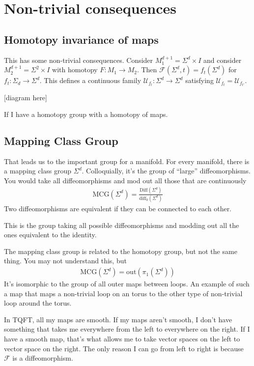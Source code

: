 \section{Non-trivial consequences}
\subsection{Homotopy invariance of maps}
This has some non-trivial consequences.
Consider $M_1^{d+1}=\Sigma^d\times I$
and consider $M_2^{d+1}=\Sigma^2\times I$
with homotopy
$F: M_1\to M_2$.
Then
$\mathcal{F}(\Sigma^d, t)
= f_t(\Sigma^d)$
for $f_t: \Sigma_d\to \Sigma^d$.
This defines a continuous family
$\mathcal{U}_{f_t}: \Sigma^d\to \Sigma^d$ satisfying
$\mathcal{U}_{f_t} = \mathcal{U}_{f_{t'}}$.

[diagram here]

If I have a homotopy group with a homotopy of maps.

\subsection{Mapping Class Group}
That leads us to the important group for a manifold.
For every manifold, there is a mapping class group $\Sigma^d$.
Colloquially, it's the group of ``large'' diffeomorphisms.
You would take all diffeomorphisms and mod out all those that are continuously
\begin{align}
    \mathrm{MCG}(\Sigma^d) = \frac{\mathrm{Diff}(\Sigma^d)}{\mathrm{diff}_0(\Sigma^d)}
\end{align}
Two diffeomorphisms are equivalent if they can be connected to each other.

This is the group taking all possible diffeomorphisms
and modding out all the ones equivalent to the identity.

The mapping class group is related to the homotopy group,
but not the same thing.
You may not understand this,
but
\begin{align}
    \mathrm{MCG}(\Sigma^d)
    = \mathrm{out}(\pi_1(\Sigma^d))
\end{align}
It's isomorphic to the group of all outer maps between loops.
An example of such a map that maps a non-trivial loop on an torus
to the other type of non-trivial loop around the torus.

In TQFT,
all my maps are smooth.
If my maps aren't smooth,
I don't have something that takes me everywhere from the left to everywhere on
the right.
If I have a smooth map,
that's what allows me to take vector spaces on the left to vector space on the
right.
The only reason I can go from left to right is because $\mathcal{F}$ is a
diffeomorphism.

